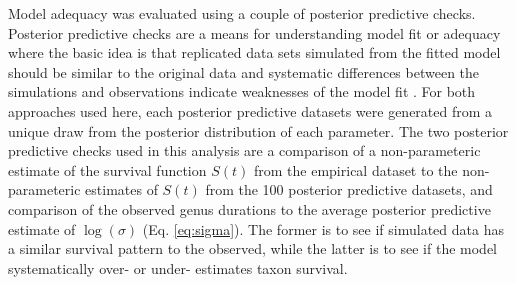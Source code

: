 \documentclass{article}
\begin{document}
%
%
%

Model adequacy was evaluated using a couple of posterior predictive checks. Posterior predictive checks are a means for understanding model fit or adequacy where the basic idea is that replicated data sets simulated from the fitted model should be similar to the original data and systematic differences between the simulations and observations indicate weaknesses of the model fit \citep{Gelman2013d}. For both approaches used here, each posterior predictive datasets were generated from a unique draw from the posterior distribution of each parameter. The two posterior predictive checks used in this analysis are a comparison of a non-parameteric estimate of the survival function \(S(t)\) from the empirical dataset to the non-parameteric estimates of \(S(t)\) from the 100 posterior predictive datasets, and comparison of the observed genus durations to the average posterior predictive estimate of \(\log(\sigma)\) (Eq. \ref{eq:sigma}). The former is to see if simulated data has a similar survival pattern to the observed, while the latter is to see if the model systematically over- or under- estimates taxon survival.
\end{document}
